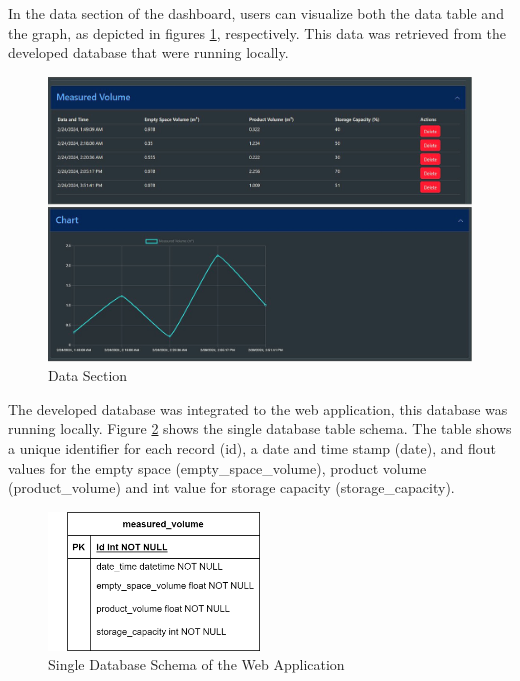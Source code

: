 
In the data section of the dashboard, users can visualize both the data table and the graph, as depicted in figures \ref{ch4:fig:data-section}, respectively. This data was retrieved from the developed database that were running locally. \\
\begin{figure}[H]
	\centering
	\includegraphics[width=1\textwidth]{Figures/data-section-resize-phone}
	\caption{Data Section}
	\label{ch4:fig:data-section}
\end{figure}

The developed database was integrated to the web application, this database was running locally. Figure \ref{ch4:fig:database-schema-design} shows the single database table schema. The table shows a unique identifier for each record (id), a date and time stamp (date), and flout values for the empty space (empty\_space\_volume), product volume (product\_volume) and int value for storage capacity (storage\_capacity).

\begin{figure}[H]
	\centering
	\includegraphics[width=0.5\textwidth]{Figures/database-schema-design}
	\caption{Single Database Schema of the Web Application}
	\label{ch4:fig:database-schema-design}
\end{figure}

